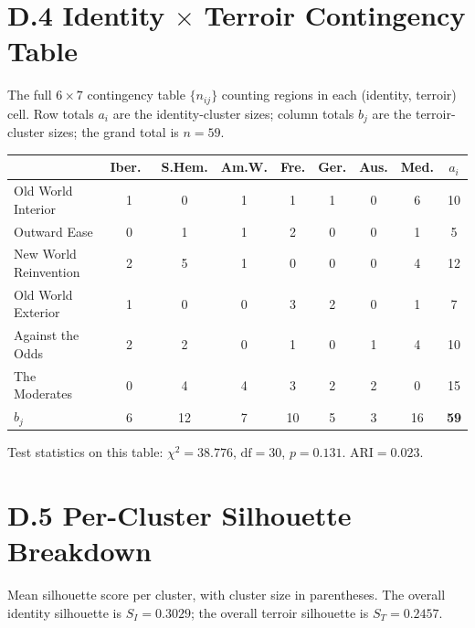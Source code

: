 \documentclass[11pt]{article}
\begin{document}
\section*{D.4 Identity $\times$ Terroir Contingency Table}
The full $6 \times 7$ contingency table $\{n_{ij}\}$ counting regions in each (identity, terroir) cell. Row totals $a_i$ are the identity-cluster sizes; column totals $b_j$ are the terroir-cluster sizes; the grand total is $n = 59$.

\begin{center}
\renewcommand{\arraystretch}{1.1}
\begin{tabular}{@{}l|ccccccc|c@{}}
\toprule
 & Iber.\ & S.Hem. & Am.W. & Fre. & Ger. & Aus. & Med. & $a_i$ \\
\midrule
Old World Interior      & 1 & 0 & 1 & 1 & 1 & 0 & 6  & 10 \\
Outward Ease            & 0 & 1 & 1 & 2 & 0 & 0 & 1  & 5  \\
New World Reinvention   & 2 & 5 & 1 & 0 & 0 & 0 & 4  & 12 \\
Old World Exterior      & 1 & 0 & 0 & 3 & 2 & 0 & 1  & 7  \\
Against the Odds        & 2 & 2 & 0 & 1 & 0 & 1 & 4  & 10 \\
The Moderates           & 0 & 4 & 4 & 3 & 2 & 2 & 0  & 15 \\
\midrule
$b_j$                   & 6 & 12 & 7 & 10 & 5 & 3 & 16 & \textbf{59} \\
\bottomrule
\end{tabular}
\end{center}

Test statistics on this table: $\chi^2 = 38.776$, $\mathrm{df} = 30$, $p = 0.131$. $\mathrm{ARI} = 0.023$.

\section*{D.5 Per-Cluster Silhouette Breakdown}
Mean silhouette score per cluster, with cluster size in parentheses. The overall identity silhouette is $S_I = 0.3029$; the overall terroir silhouette is $S_T = 0.2457$.
\end{document}
